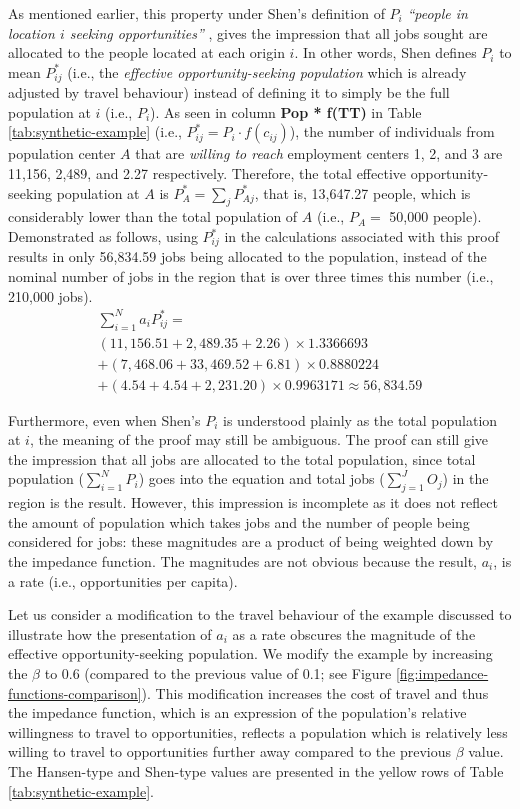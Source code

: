 \documentclass[10pt,letterpaper]{article}
\begin{document}
As mentioned earlier, this property under Shen's definition of \(P_i\)
\emph{``people in location \(i\) seeking opportunities''} , gives the
impression that all jobs sought are allocated to the people located at
each origin \(i\). In other words, Shen defines \(P_i\) to mean
\(P_{ij}^*\) (i.e., the \emph{effective opportunity-seeking population}
which is already adjusted by travel behaviour) instead of defining it to
simply be the full population at \(i\) (i.e., \(P_i\)). As seen in
column \textbf{Pop * f(TT)} in Table \ref{tab:synthetic-example} (i.e.,
\(P_{ij}^* = P_i\cdot f(c_{ij})\)), the number of individuals from
population center \(A\) that are \emph{willing to reach} employment
centers 1, 2, and 3 are 11,156, 2,489, and 2.27 respectively. Therefore,
the total effective opportunity-seeking population at \(A\) is
\(P_A^* = \sum_jP_{Aj}^*\), that is, 13,647.27 people, which is
considerably lower than the total population of \(A\) (i.e., \(P_A=\)
50,000 people). Demonstrated as follows, using \(P_{ij}^*\) in the
calculations associated with this proof results in only 56,834.59 jobs
being allocated to the population, instead of the nominal number of jobs
in the region that is over three times this number (i.e., 210,000 jobs).
\[
\begin{array}{l}
\sum_{i=1}^N a_{i} P_{ij}^* =\\
(11,156.51 + 2,489.35 + 2.26)\times 1.3366693 \\
+ (7,468.06 + 33,469.52 + 6.81)\times 0.8880224\\
+ (4.54 + 4.54 + 2,231.20)\times 0.9963171 \approx 56,834.59
\end{array}
\]

Furthermore, even when Shen's \(P_i\) is understood plainly as the total
population at \(i\), the meaning of the proof may still be ambiguous.
The proof can still give the impression that all jobs are allocated to
the total population, since total population (\(\sum_{i=1}^N P_i\)) goes
into the equation and total jobs (\(\sum_{j=1}^JO_j\)) in the region is
the result. However, this impression is incomplete as it does not
reflect the amount of population which takes jobs and the number of
people being considered for jobs: these magnitudes are a product of
being weighted down by the impedance function. The magnitudes are not
obvious because the result, \(a_i\), is a rate (i.e., opportunities per
capita).

Let us consider a modification to the travel behaviour of the example
discussed to illustrate how the presentation of \(a_i\) as a rate
obscures the magnitude of the effective opportunity-seeking population.
We modify the example by increasing the \(\beta\) to 0.6 (compared to
the previous value of 0.1; see Figure
\ref{fig:impedance-functions-comparison}). This modification increases
the cost of travel and thus the impedance function, which is an
expression of the population's relative willingness to travel to
opportunities, reflects a population which is relatively less willing to
travel to opportunities further away compared to the previous \(\beta\)
value. The Hansen-type and Shen-type values are presented in the yellow
rows of Table \ref{tab:synthetic-example}.
\end{document}
